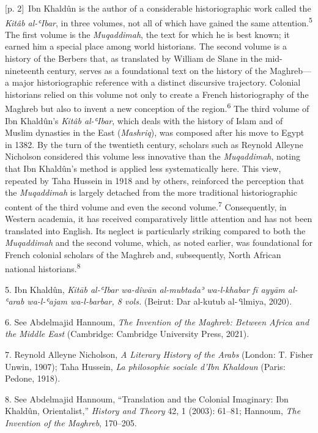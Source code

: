 \documentclass[10pt,a4paper]{article}
\begin{document}
{\scriptsize\color{gray} [p. 2]}\ Ibn Khaldûn is the author of a considerable historiographic work called the \textit{Kitâb al-ʿIbar}, in three volumes, not all of which have gained the same attention.\nobreak\textsuperscript{5} The first volume is the \textit{Muqaddimah}, the text for which he is best known; it earned him a special place among world historians. The second volume is a history of the Berbers that, as translated by William de Slane in the mid-nineteenth century, serves as a foundational text on the history of the Maghreb—a major historiographic reference with a distinct discursive trajectory. Colonial historians relied on this volume not only to create a French historiography of the Maghreb but also to invent a new conception of the region.\nobreak\textsuperscript{6} The third volume of Ibn Khaldûn’s \textit{Kitâb al-ʿIbar}, which deals with the history of Islam and of Muslim dynasties in the East (\textit{Mashriq}), was composed after his move to Egypt in 1382. By the turn of the twentieth century, scholars such as Reynold Alleyne Nicholson considered this volume less innovative than the \textit{Muqaddimah}, noting that Ibn Khaldûn’s method is applied less systematically here. This view, repeated by Taha Hussein in 1918 and by others, reinforced the perception that the \textit{Muqaddimah} is largely detached from the more traditional historiographic content of the third volume and even the second volume.\nobreak\textsuperscript{7} Consequently, in Western academia, it has received comparatively little attention and has not been translated into English. Its neglect is particularly striking compared to both the \textit{Muqaddimah} and the second volume, which, as noted earlier, was foundational for French colonial scholars of the Maghreb and, subsequently, North African national historians.\nobreak\textsuperscript{8}\par{\small 5. Ibn Khaldûn, \textit{Kitāb al-ʿIbar wa-dîwān al-mubtadaʾ wa-l-khabar fī ayyām al-ʿarab wa-l-ʿajam wa-l-barbar, 8 vols.} (Beirut: Dar al-kutub al-\textit{ʿ}ilmiya, 2020).\par}{\small 6. See Abdelmajid Hannoum, \textit{The Invention of the Maghreb: Between Africa and the Middle East} (Cambridge: Cambridge University Press, 2021).\par}{\small 7. Reynold Alleyne Nicholson, \textit{A Literary History of the Arabs} (London: T. Fisher Unwin, 1907); Taha Hussein, \textit{La philosophie sociale d’Ibn Khaldoun} (Paris: Pedone, 1918).\par}{\small 8. See Abdelmajid Hannoum, “Translation and the Colonial Imaginary: Ibn Khaldûn, Orientalist,” \textit{History and Theory} 42, 1 (2003): 61–81; Hannoum, \textit{The Invention of the Maghreb}, 170–205.\par}
\end{document}
